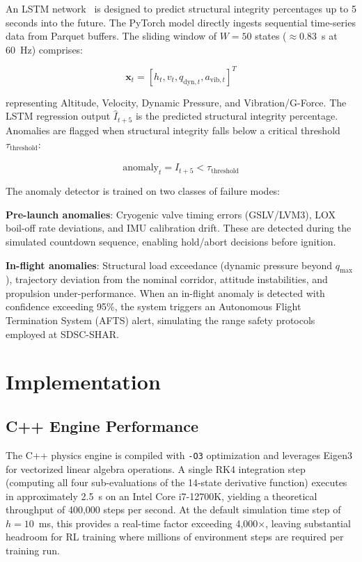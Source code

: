\documentclass[conference]{IEEEtran}
\newcommand{\vect}[1]{\boldsymbol{#1}}
\begin{document}
An LSTM network~\cite{hochreiter1997long} is designed to predict structural integrity percentages up to 5 seconds into the future. The PyTorch model directly ingests sequential time-series data from Parquet buffers. The sliding window of $W=50$ states ($\approx$0.83~s at 60~Hz) comprises:

\begin{equation}
    \vect{x}_t = [h_t, v_t, q_{\text{dyn}, t}, a_{\text{vib}, t}]^T
\end{equation}

\noindent representing Altitude, Velocity, Dynamic Pressure, and Vibration/G-Force. The LSTM regression output $\hat{I}_{t+5}$ is the predicted structural integrity percentage. Anomalies are flagged when structural integrity falls below a critical threshold $\tau_{\text{threshold}}$:

\begin{equation}
    \text{anomaly}_t = \hat{I}_{t+5} < \tau_{\text{threshold}}
    \label{eq:anomaly}
\end{equation}

The anomaly detector is trained on two classes of failure modes:

\textbf{Pre-launch anomalies}: Cryogenic valve timing errors (GSLV/LVM3), LOX boil-off rate deviations, and IMU calibration drift. These are detected during the simulated countdown sequence, enabling hold/abort decisions before ignition.

\textbf{In-flight anomalies}: Structural load exceedance (dynamic pressure beyond $q_{\max}$), trajectory deviation from the nominal corridor, attitude instabilities, and propulsion under-performance. When an in-flight anomaly is detected with confidence exceeding 95\%, the system triggers an Autonomous Flight Termination System (AFTS) alert, simulating the range safety protocols employed at SDSC-SHAR.

\section{Implementation}

\subsection{C++ Engine Performance}

The C++ physics engine is compiled with \texttt{-O3} optimization and leverages Eigen3 for vectorized linear algebra operations. A single RK4 integration step (computing all four sub-evaluations of the 14-state derivative function) executes in approximately 2.5~\textmu{}s on an Intel Core i7-12700K, yielding a theoretical throughput of 400,000 steps per second. At the default simulation time step of $h = 10$~ms, this provides a real-time factor exceeding 4,000$\times$, leaving substantial headroom for RL training where millions of environment steps are required per training run.
\end{document}
